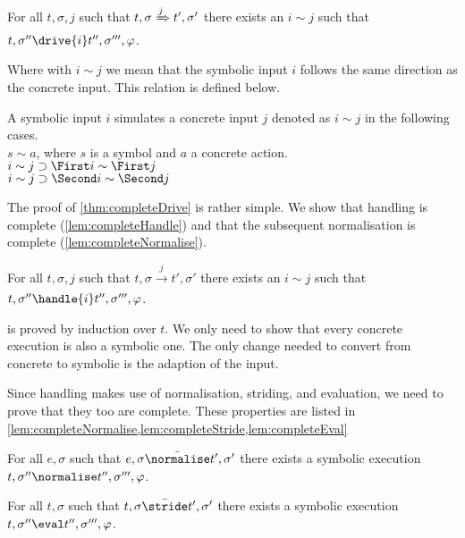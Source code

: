 \begin{theorem}
  \label{thm:completeDrive}
  For all $t,\sigma,j$ such that $t,\sigma \xRightarrow[]{j} t',\sigma'$
  there exists an $i\sim j$ such that $t,\sigma''\drive{i} t'',\sigma''',\phi$.
\end{theorem}

Where with $i\sim j$ we mean that the symbolic input $i$ follows the same direction as the concrete input.
This relation is defined below.

\begin{definition}
  A symbolic input $i$ simulates a concrete input $j$ denoted as $i\sim j$ in the following cases.\\
  $s\sim a$, where $s$ is a symbol and $a$ a concrete action.\\
  $i\sim j\implies \First i \sim \First j$\\
  $i\sim j\implies \Second i \sim \Second j$
\end{definition}

The proof of \cref{thm:completeDrive} is rather simple.
We show that handling is complete (\cref{lem:completeHandle})
and that the subsequent normalisation is complete (\cref{lem:completeNormalise}).


\begin{lemma}
  \label{lem:completeHandle}
  For all $t,\sigma,j$ such that $t,\sigma \xrightarrow[]{j} t',\sigma'$
  there exists an $i\sim j$ such that $t,\sigma''\handle{i} t'',\sigma''',\phi$.
\end{lemma}

 is proved by induction over $t$.
We only need to show that every concrete execution is also a symbolic one.
The only change needed to convert from concrete to symbolic is the adaption of the input.

Since handling makes use of normalisation, striding, and evaluation, we need to prove that they too are complete.
These properties are listed in \cref{lem:completeNormalise,lem:completeStride,lem:completeEval}

\begin{lemma}
  \label{lem:completeNormalise}
  For all $e,\sigma$ such that $e,\sigma \bar{\normalise}t',\sigma'$
  there exists a symbolic execution $t,\sigma''\normalise t'',\sigma''',\phi$.
\end{lemma}


\begin{lemma}
  \label{lem:completeStride}
  For all $t,\sigma$ such that $t,\sigma \bar{\stride}t',\sigma'$
  there exists a symbolic execution $t,\sigma''\eval t'',\sigma''',\phi$.
\end{lemma}


